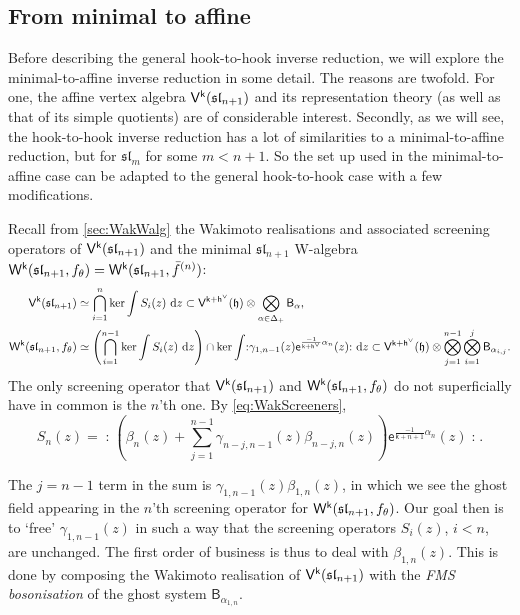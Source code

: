 \documentclass[10pt,a4paper]{amsart}
\numberwithin{equation}{section}
\renewcommand{\cong}{\simeq} %
\newcommand{\dd}{\mathrm{d}}   %
\newcommand{\ee}{\mathsf{e}}   %
\newcommand{\kk}{\mathsf{k}}   %
\DeclarePairedDelimiter{\brac}{\lparen}{\rparen}   %
\newcommand{\no}[1]{\mathopen{:} #1 \mathclose{:}} %
\newcommand{\alg}[1]{\mathfrak{#1}}  %
\newcommand{\VOA}[1]{\mathsf{#1}}    %
\newcommand{\SLA}[2]{\alg{#1}_{#2}}                      %
\newcommand{\slnpone}{\SLA{sl}{n+1}}
\newcommand{\cartan}{\mathfrak{h}}
\newcommand{\cox}{\mathsf{h}}                                        %
\newcommand{\dcox}{\coroot{\cox}}                                    %
\newcommand{\proots}{\Delta_+}                                       %
\newcommand{\sroot}[1]{\alpha_{#1}}                                  %
\newcommand{\coroot}[1]{#1^{\vee}}                                   %
\newcommand{\fmin}{f_\theta}                                        %
\newcommand{\Wsymb}{\VOA{W}}
\newcommand{\uaffvoa}[2]{\VOA{V}^{#1}\brac{#2}}                   %
\newcommand{\bgvoa}{\VOA{B}}                                      %
\newcommand{\uQHR}[3]{\Wsymb^{#1}\brac{#2,#3}}                    %
\theoremstyle{plain}
\begin{document}
\subsection{From minimal to affine} \label{subsec:MintoAff}
Before describing the general hook-to-hook inverse reduction, we will explore the minimal-to-affine inverse reduction in some detail. The reasons are twofold. For one, the affine vertex algebra $\uaffvoa{\kk}{\slnpone}$ and its representation theory (as well as that of its simple quotients) are of considerable interest. Secondly, as we will see, the hook-to-hook inverse reduction has a lot of similarities to a minimal-to-affine reduction, but for $\mathfrak{sl}_m$ for some $m < n+1$. So the set up used in the minimal-to-affine case can be adapted to the general hook-to-hook case with a few modifications. 

Recall from \cref{sec:WakWalg} the Wakimoto realisations and associated screening operators of $\uaffvoa{\kk}{\slnpone}$ and the minimal $\slnpone$ W-algebra $\uQHR{\kk}{\slnpone}{\fmin} =\uQHR{\kk}{\slnpone}{\bar{f}^{(n)}}$:
%
\begin{equation} \label{eq:WakAffandMin}
\begin{aligned}
    \uaffvoa{\kk}{\slnpone} &\cong \bigcap_{i=1}^n \textup{ker} \int S_i(z) \ \dd z \subset \uaffvoa{\kk+\dcox}{\cartan} \otimes \bigotimes_{\alpha \in \proots} \bgvoa_\alpha, \\
    \uQHR{\kk}{\slnpone}{\fmin} &\cong \left( \bigcap_{i=1}^{n-1} \textup{ker} \int S_i(z) \ \dd z \right) \cap \textup{ker} \int \no{\gamma_{1,n-1}(z) \ee^{\frac{-1}{\kk+\dcox} \alpha_{n}}(z)} \ \dd z \subset \uaffvoa{\kk+\dcox}{\cartan} \otimes \bigotimes_{j=1}^{n-1}\bigotimes_{i=1}^{j} \bgvoa_{\sroot{i,j}}.
\end{aligned}
\end{equation}
%
The only screening operator that $\uaffvoa{\kk}{\slnpone}$ and $\uQHR{\kk}{\slnpone}{\fmin}$ do not superficially have in common is the $n$'th one. By \eqref{eq:WakScreeners},
%
\begin{equation}
    S_n(z) = \no{\left( \beta_n(z) + \sum_{j=1}^{n-1} \gamma_{n-j,n-1}(z) \beta_{n-j,n}(z)  \right) \ee^{\frac{-1}{\kk+n+1} \alpha_n}(z) }.
\end{equation}

The $j=n-1$ term in the sum is $\gamma_{1,n-1}(z)\beta_{1,n}(z)$, in which we see the ghost field appearing in the $n$'th screening operator for $\uQHR{\kk}{\slnpone}{\fmin}$. Our goal then is to `free' $\gamma_{1,n-1}(z)$ in such a way that the screening operators $S_i(z)$, $i < n$, are unchanged. The first order of business is thus to deal with $\beta_{1,n}(z)$. This is done by composing the Wakimoto realisation of $\uaffvoa{\kk}{\slnpone}$ with the \emph{FMS bosonisation} \cite{FMS86} of the ghost system $\bgvoa_{\sroot{1,n}}$.
\end{document}

